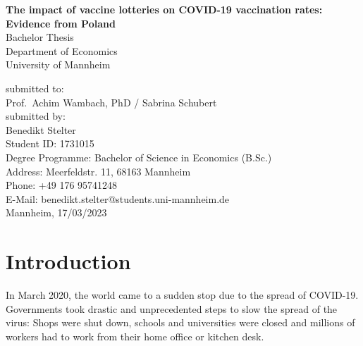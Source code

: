 \documentclass{scrbook}
\begin{document}
	
\frontmatter
\begin{titlepage}

\begin{center}

\vspace*{1,2cm}

\huge {\bfseries The impact of vaccine lotteries on COVID-19 vaccination
rates: Evidence from Poland}\\[1.8cm]

\Large {Bachelor Thesis}\\[1cm]

\large {Department of Economics}\\[0.2cm]

\large {University of Mannheim}\\[0.5cm]

\end{center}

\vfill

\noindent submitted to:\\
Prof.~Achim Wambach, PhD / Sabrina Schubert\\[1cm]
submitted by:\\
Benedikt Stelter\\[1cm]
Student ID: 1731015\\
Degree Programme: Bachelor of Science in Economics (B.Sc.)\\[1cm]
Address: Meerfeldstr. 11, 68163 Mannheim\\
Phone: +49 176 95741248\\
E-Mail: benedikt.stelter@students.uni-mannheim.de\\[1cm]
Mannheim, 17/03/2023

\setcounter{page}{0}

\end{titlepage}

  \tableofcontents


\listoffigures

\listoftables


\mainmatter

\chapter{Introduction}

In March 2020, the world came to a sudden stop due to the spread of
COVID-19. Governments took drastic and unprecedented steps to slow the
spread of the virus: Shops were shut down, schools and universities were
closed and millions of workers had to work from their home office or
kitchen desk.
\end{document}
